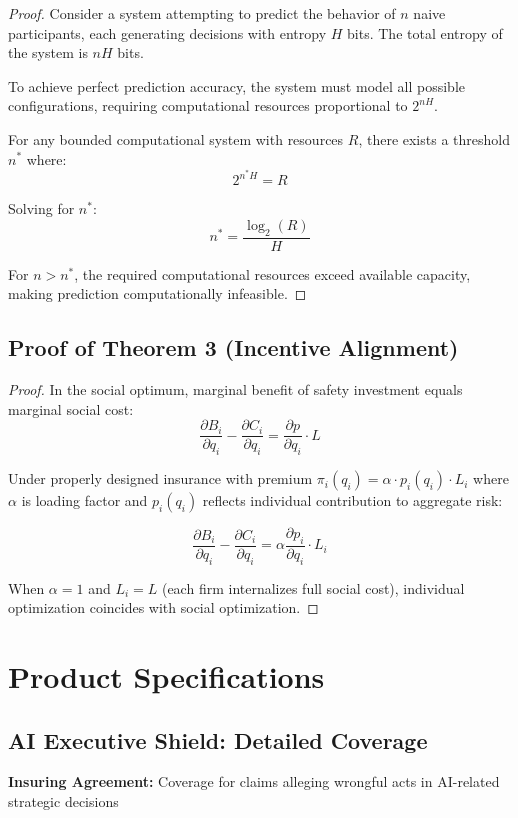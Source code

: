 \documentclass[11pt]{article}
\begin{document}
\begin{proof}
Consider a system attempting to predict the behavior of $n$ naive participants, each generating decisions with entropy $H$ bits. The total entropy of the system is $nH$ bits.

To achieve perfect prediction accuracy, the system must model all possible configurations, requiring computational resources proportional to $2^{nH}$.

For any bounded computational system with resources $R$, there exists a threshold $n^*$ where:
$$2^{n^*H} = R$$

Solving for $n^*$:
$$n^* = \frac{\log_2(R)}{H}$$

For $n > n^*$, the required computational resources exceed available capacity, making prediction computationally infeasible.
\end{proof}

\subsection{Proof of Theorem 3 (Incentive Alignment)}

\begin{proof}
In the social optimum, marginal benefit of safety investment equals marginal social cost:
$$\frac{\partial B_i}{\partial q_i} - \frac{\partial C_i}{\partial q_i} = \frac{\partial p}{\partial q_i} \cdot L$$

Under properly designed insurance with premium $\pi_i(q_i) = \alpha \cdot p_i(q_i) \cdot L_i$ where $\alpha$ is loading factor and $p_i(q_i)$ reflects individual contribution to aggregate risk:

$$\frac{\partial B_i}{\partial q_i} - \frac{\partial C_i}{\partial q_i} = \alpha \frac{\partial p_i}{\partial q_i} \cdot L_i$$

When $\alpha = 1$ and $L_i = L$ (each firm internalizes full social cost), individual optimization coincides with social optimization.
\end{proof}

\section{Product Specifications}

\subsection{AI Executive Shield: Detailed Coverage}

\textbf{Insuring Agreement:} Coverage for claims alleging wrongful acts in AI-related strategic decisions
\end{document}
